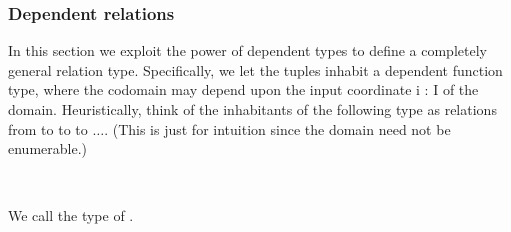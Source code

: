 \documentclass[a4paper,UKenglish,cleveref,autoref,thm-restate,11pt]{lipics-v2021}
\begin{document}
\subsubsection{Dependent relations}\label{dependent-relations}

In this section we exploit the power of dependent types to define a completely general relation type. Specifically, we let the tuples inhabit a dependent function type, where the codomain may depend upon the input coordinate \ab i \as : \ab I of the domain. Heuristically, think of the inhabitants of the following type as relations from   to   to   to $\ldots$. (This is just for intuition since the domain  need not be enumerable.)
\ccpad
\begin{code}%
\>[0]\AgdaSpace{}%
\AgdaSymbol{:}\AgdaSpace{}%
\AgdaSymbol{(}\AgdaSpace{}%
\AgdaSymbol{:}\AgdaSpace{}%
\AgdaSpace{}%
\AgdaSymbol{)(}\AgdaSpace{}%
\AgdaSymbol{:}\AgdaSpace{}%
\AgdaSpace{}%
\AgdaSpace{}%
\AgdaSpace{}%
\AgdaSymbol{)(}\AgdaSpace{}%
\AgdaSymbol{:}\AgdaSpace{}%
\AgdaSymbol{)}\AgdaSpace{}%
\AgdaSpace{}%
\AgdaSpace{}%
\AgdaSpace{}%
\AgdaSpace{}%
\AgdaSpace{}%
\AgdaSpace{}%
\AgdaSpace{}%
\<%
\\
\>[0]\AgdaSpace{}%
\AgdaSpace{}%
\AgdaSpace{}%
\AgdaSpace{}%
\AgdaSymbol{=}\AgdaSpace{}%
\AgdaSpace{}%
\AgdaSpace{}%
\AgdaSpace{}%
\AgdaSpace{}%
\<%
\end{code}
\ccpad
We call  the type of .

\end{document}
